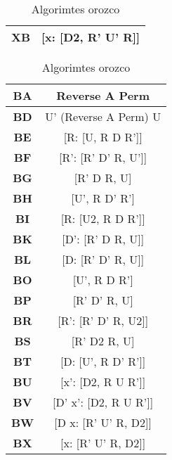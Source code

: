\begin{table}[!h]
\begin{minipage}{.5\linewidth}
\begin{tabular}{|c|c|}
            \hline
            \textbf{XB} & [x: [D2, R' U' R]] \\
            \hline 
        \end{tabular}
    \end{minipage}
    \begin{minipage}{.5\linewidth}
        \centering
        \begin{tabular}{|c|c|}
            \hline
            \textbf{BA} & Reverse A Perm \\
            \hline
            \textbf{BD} & U' (Reverse A Perm) U \\
            \hline
            \textbf{BE} & [R: [U, R D R']] \\
            \hline
            \textbf{BF} & [R': [R' D' R, U']] \\
            \hline
            \textbf{BG} & [R' D R, U] \\
            \hline
            \textbf{BH} & [U', R D' R'] \\
            \hline
            \textbf{BI} & [R: [U2, R D R']] \\
            \hline
            \textbf{BK} & [D': [R' D R, U]] \\
            \hline
            \textbf{BL} & [D: [R' D' R, U]] \\
            \hline
            \textbf{BO} & [U', R D R'] \\
            \hline
            \textbf{BP} & [R' D' R, U] \\
            \hline
            \textbf{BR} & [R': [R' D' R, U2]] \\
            \hline
            \textbf{BS} & [R' D2 R, U] \\
            \hline
            \textbf{BT} & [D: [U', R D' R']] \\
            \hline
            \textbf{BU} & [x': [D2, R U R']] \\
            \hline
            \textbf{BV} & [D' x': [D2, R U R']] \\
            \hline
            \textbf{BW} & [D x: [R' U' R, D2]] \\
            \hline
            \textbf{BX} & [x: [R' U' R, D2]] \\
            \hline 
        \end{tabular}
    \end{minipage} 
    \caption{Algorimtes orozco}
    \label{fig:taula-orozco}
\end{table}


